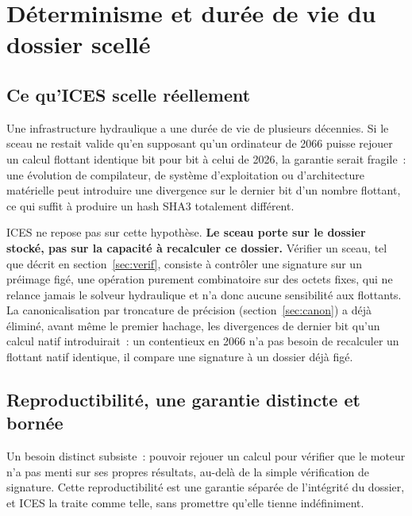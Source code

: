 \documentclass[11pt,a4paper]{article}
\begin{document}
\section{Déterminisme et durée de vie du dossier scellé}\label{sec:determinisme}

\subsection{Ce qu'ICES scelle réellement}

Une infrastructure hydraulique a une durée de vie de plusieurs décennies. Si le sceau ne restait valide qu'en supposant qu'un ordinateur de 2066 puisse rejouer un calcul flottant identique bit pour bit à celui de 2026, la garantie serait fragile~: une évolution de compilateur, de système d'exploitation ou d'architecture matérielle peut introduire une divergence sur le dernier bit d'un nombre flottant, ce qui suffit à produire un hash SHA3 totalement différent.

ICES ne repose pas sur cette hypothèse. \textbf{Le sceau porte sur le dossier stocké, pas sur la capacité à recalculer ce dossier.} Vérifier un sceau, tel que décrit en section~\ref{sec:verif}, consiste à contrôler une signature sur un préimage figé, une opération purement combinatoire sur des octets fixes, qui ne relance jamais le solveur hydraulique et n'a donc aucune sensibilité aux flottants. La canonicalisation par troncature de précision (section~\ref{sec:canon}) a déjà éliminé, avant même le premier hachage, les divergences de dernier bit qu'un calcul natif introduirait~: un contentieux en 2066 n'a pas besoin de recalculer un flottant natif identique, il compare une signature à un dossier déjà figé.

\subsection{Reproductibilité, une garantie distincte et bornée}

Un besoin distinct subsiste~: pouvoir rejouer un calcul pour vérifier que le moteur n'a pas menti sur ses propres résultats, au-delà de la simple vérification de signature. Cette reproductibilité est une garantie séparée de l'intégrité du dossier, et ICES la traite comme telle, sans promettre qu'elle tienne indéfiniment.
\end{document}
